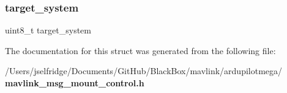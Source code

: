\subsubsection{target\+\_\+system}
{\footnotesize\ttfamily uint8\+\_\+t target\+\_\+system}



The documentation for this struct was generated from the following file\+:\begin{DoxyCompactItemize}
\item 
/\+Users/jselfridge/\+Documents/\+Git\+Hub/\+Black\+Box/mavlink/ardupilotmega/\textbf{ mavlink\+\_\+msg\+\_\+mount\+\_\+control.\+h}\end{DoxyCompactItemize}
